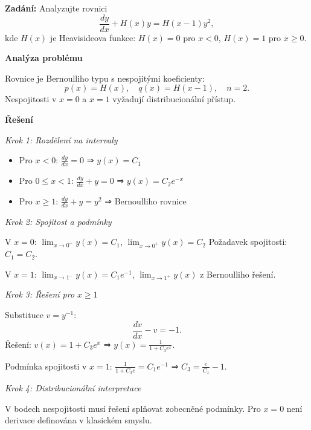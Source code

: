 \begin{example}
\label{ex:e1-nespojite-koeficienty}

\noindent\textbf{Zadání:} Analyzujte rovnici
\[
\frac{dy}{dx} + H(x)y = H(x-1)y^2,
\]
kde $H(x)$ je Heavisideova funkce: $H(x) = 0$ pro $x < 0$, $H(x) = 1$ pro $x \geq 0$.

\vspace{1.5\baselineskip}

\noindent\textbf{Analýza problému}

\noindent Rovnice je Bernoulliho typu s nespojitými koeficienty:
\[
p(x) = H(x), \quad q(x) = H(x-1), \quad n = 2.
\]
Nespojitosti v $x = 0$ a $x = 1$ vyžadují distribucionální přístup.

\vspace{1.5\baselineskip}

\noindent\textbf{Řešení}

\noindent\textit{Krok 1: Rozdělení na intervaly}

\begin{itemize}
\item Pro $x < 0$: $\frac{dy}{dx} = 0$ ⇒ $y(x) = C_1$
\item Pro $0 \leq x < 1$: $\frac{dy}{dx} + y = 0$ ⇒ $y(x) = C_2 e^{-x}$
\item Pro $x \geq 1$: $\frac{dy}{dx} + y = y^2$ ⇒ Bernoulliho rovnice
\end{itemize}

\noindent\textit{Krok 2: Spojitost a podmínky}

V $x = 0$: $\lim_{x \to 0^-} y(x) = C_1$, $\lim_{x \to 0^+} y(x) = C_2$
Požadavek spojitosti: $C_1 = C_2$.

V $x = 1$: $\lim_{x \to 1^-} y(x) = C_1 e^{-1}$, $\lim_{x \to 1^+} y(x)$ z Bernoulliho řešení.

\noindent\textit{Krok 3: Řešení pro $x \geq 1$}

Substituce $v = y^{-1}$:
\[
\frac{dv}{dx} - v = -1.
\]
Řešení: $v(x) = 1 + C_3 e^{x}$ ⇒ $y(x) = \frac{1}{1 + C_3 e^{x}}$.

Podmínka spojitosti v $x = 1$: $\frac{1}{1 + C_3 e} = C_1 e^{-1}$ ⇒ $C_3 = \frac{e}{C_1} - 1$.

\noindent\textit{Krok 4: Distribucionální interpretace}

V bodech nespojitosti musí řešení splňovat zobecněné podmínky. Pro $x = 0$ 
není derivace definována v klasickém smyslu.

\vspace{1.5\baselineskip}


\end{example}
